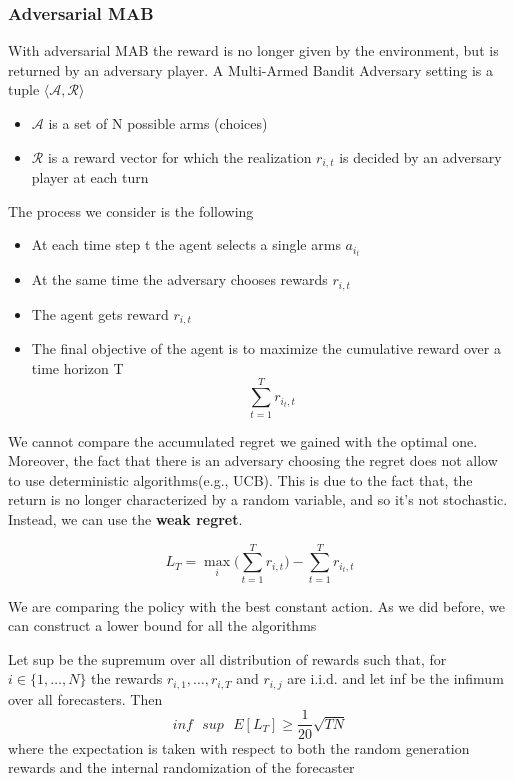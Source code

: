 \documentclass[../main.tex]{subfiles}
\begin{document}
\subsubsection{Adversarial MAB}
With adversarial MAB the reward is no longer given by the environment, but is returned by an adversary player. A Multi-Armed Bandit Adversary setting is a tuple $\langle \mathcal{A}, \mathcal{R} \rangle$
\begin{itemize}
    \item $\mathcal{A}$ is a set of N possible arms (choices)
    \item $\mathcal{R}$ is a reward vector for which the realization $r_{i,t}$ is decided by an adversary player at each turn
\end{itemize}
The process we consider is the following
\begin{itemize}
    \item At each time step t the agent selects a single arms $a_{i_t}$
    \item At the same time the adversary chooses rewards $r_{i,t}$
    \item The agent gets reward $r_{i,t}$
    \item The final objective of the agent is to maximize the cumulative reward over a time horizon T
          \begin{equation*}
              \sum_{t=1}^T r_{i_t,t}
          \end{equation*}
\end{itemize}
We cannot compare the accumulated regret we gained with the optimal one. Moreover, the fact that there is an adversary choosing the regret does not allow to use deterministic algorithms(e.g., UCB). This is due to the fact that, the return is no longer characterized by a random variable, and so it's not stochastic. Instead, we can use the \textbf{weak regret}.
\begin{definition}
    \begin{equation*}
        L_T = \max_i \bigg( \sum_{t=1}^T r_{i,t} \bigg) - \sum_{t=1}^T r_{i_t,t}
    \end{equation*}
\end{definition}
We are comparing the policy with the best constant action.
As we did before, we can construct a lower bound for all the algorithms
\begin{theorem}
    Let sup be the supremum over all distribution of rewards such that, for $i \in \{ 1, \dots, N \}$ the rewards $r_{i,1}, \dots, r_{i,T}$ and $r_{i,j}$ are i.i.d. and let inf be the infimum over all forecasters. Then
    \begin{equation*}
        inf\text{ }sup\text{ }E[L_T] \geq \frac{1}{20}\sqrt{TN}
    \end{equation*}
    where the expectation is taken with respect to both the random generation rewards and the internal randomization of the forecaster
\end{theorem}
\end{document}
